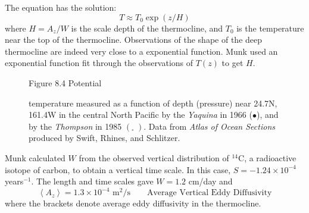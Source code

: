 The equation has the solution:
\begin{equation}
T \approx T_0 \exp (z/H)
\end{equation}
where $H=A_z/W$ is the scale depth of the
thermocline, and $T_0$ is the temperature near the
top of the thermocline. Observations of the shape of the deep
thermocline are indeed very close to a exponential function.  Munk
used an exponential function fit through the observations of $T(z)$ to
get $H$.

\begin{figure}[t!]
\footnotesize
Figure 8.4 Potential \rule{0mm}{3ex}temperature measured as a function
of depth (pressure) near 24.7\degrees N, 161.4\degrees W in the
central North Pacific by the \textit{Yaquina} in 1966 ($\bullet$), and
by the \textit{Thompson} in 1985 $\left( _\square \;\right)$. Data
from \textit{Atlas of Ocean Sections} produced by Swift, Rhines, and
Schlitzer.
\label{fig:mixing}
\vspace{-3ex}
\end{figure}

Munk calculated $W$ from the observed vertical distribution of
$^{14}$C, a radioactive isotope of carbon, to obtain a vertical time
scale. In this case, $S=-1.24 \times 10^{-4}$ years$^{-1}$. The length
and time scales gave $W=1.2$ cm/day and
\begin{equation}
\left< A_z \right> = 1.3 \times 10^{-4} \text{ m$^2$/s} \qquad \text{Average
Vertical Eddy Diffusivity}
\end{equation}
where the brackets denote average eddy diffusivity in the
thermocline.


